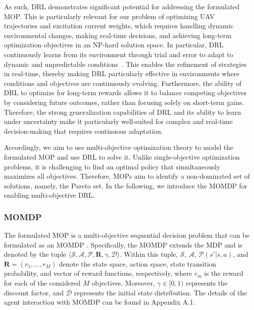 \documentclass[10pt,journal,compsoc]{IEEEtran}
\begin{document}
\par As such, DRL demonstrates significant potential for addressing the formulated MOP. This is particularly relevant for our problem of optimizing UAV trajectories and excitation current weights, which requires handling dynamic environmental changes, making real-time decisions, and achieving long-term optimization objectives in an NP-hard solution space. In particular, DRL continuously learns from its environment through trial and error to adapt to dynamic and unpredictable conditions~\cite{ZhangSurvey}. This enables the refinement of strategies in real-time, thereby making DRL particularly effective in environments where conditions and objectives are continuously evolving. Furthermore, the ability of DRL to optimize for long-term rewards allows it to balance competing objectives by considering future outcomes, rather than focusing solely on short-term gains. Therefore, the strong generalization capabilities of DRL and its ability to learn under uncertainty make it particularly well-suited for complex and real-time decision-making that requires continuous adaptation.

\par Accordingly, we aim to use multi-objective optimization theory to model the formulated MOP and use DRL to solve it. Unlike single-objective optimization problems, it is challenging to find an optimal policy that simultaneously maximizes all objectives. Therefore, MOPs aim to identify a non-dominated set of solutions, namely, the Pareto set. In the following, we introduce the MOMDP for enabling multi-objective DRL.



%
%
\subsubsection{MOMDP}

\par The formulated MOP is a multi-objective sequential decision problem that can be formulated as an MOMDP \cite{xu2020prediction}. Specifically, the MOMDP extends the MDP and is denoted by the tuple $\langle \mathcal{S}, \mathcal{A}, \mathcal{P}, \mathbf{R}, \gamma, \mathcal{D} \rangle$. Within this tuple, $\mathcal{S}$, $\mathcal{A}$, $\mathcal{P} (s' | s, a)$, and $\mathbf{R} = (r_1, \ldots, r_M)$ denote the state space, action space, state transition probability, and vector of reward functions, respectively, where $r_m$ is the reward for each of the considered $M$ objectives. Moreover, $\gamma \in [0, 1)$ represents the discount factor, and $\mathcal{D}$ represents the initial state distribution. The details of the agent interaction with MOMDP can be found in Appendix A.1.
\end{document}
